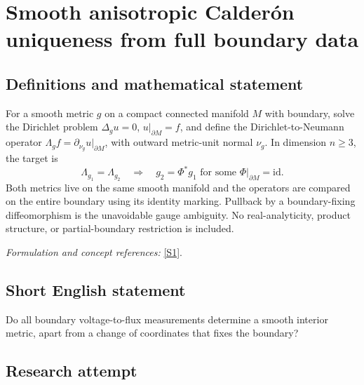 \documentclass[11pt,a4paper]{article}
\newcommand{\sref}[2]{\hyperlink{source:#1:#2}{[S#2]}}
\newif\ifshowcatalogue
\newcommand{\cataloguescope}[1]{\ifshowcatalogue
 \paragraph{Exact scope in the supplied catalogue.}
 \begin{quote}\small #1\end{quote}\fi}
\numberwithin{equation}{section}
\begin{document}
\setcounter{section}{0}
\clearpage
\section*{\texorpdfstring{Smooth anisotropic Calderón uniqueness from full boundary data}{Smooth anisotropic Calderón uniqueness from full boundary data}}\label{30006770}
\subsection{Definitions and mathematical statement}
For a smooth metric $g$ on a compact connected manifold $M$ with boundary, solve the Dirichlet problem $\Delta_g u=0$, $u|_{\partial M}=f$, and define the Dirichlet-to-Neumann operator
$\Lambda_g f=\partial_{\nu_g}u|_{\partial M}$, with outward metric-unit normal $\nu_g$. In dimension $n\ge3$, the target is
\[
 \Lambda_{g_1}=\Lambda_{g_2}\quad\Longrightarrow\quad
 g_2=\Phi^*g_1\text{ for some }\Phi|_{\partial M}=\mathrm{id}.
\]
Both metrics live on the same smooth manifold and the operators are compared on the entire boundary using its identity marking. Pullback by a boundary-fixing diffeomorphism is the unavoidable gauge ambiguity. No real-analyticity, product structure, or partial-boundary restriction is included.
\par\smallskip\textit{Formulation and concept references:} \sref{30006770}{1}.
\cataloguescope{For every compact connected smooth manifold M of dimension n>=3 with smooth nonempty boundary and every pair of smooth Riemannian metrics g1,g2 on that same M, let Lambda\_gj f be the outward metric-unit normal derivative of the unique solution of Delta\_gj u=0 with u|boundary=f. If Lambda\_g1=Lambda\_g2 as operators C-infinity(boundary M) to C-infinity(boundary M), compared under the identity marking on the whole boundary, must there be a smooth diffeomorphism Phi:M->M fixing the boundary pointwise with g2=Phi\textasciicircum{}*g1?}
\subsection{Short English statement}
Do all boundary voltage-to-flux measurements determine a smooth interior metric, apart from a change of coordinates that fixes the boundary?
\subsection{Research attempt}
\end{document}
